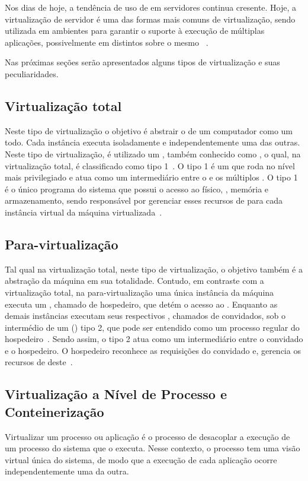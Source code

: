 Nos dias de hoje, a tendência de uso de \vms em servidores continua cresente. Hoje, a virtualização de servidor é uma das formas mais comuns de virtualização, sendo utilizada em ambientes \cloud para garantir o suporte à execução de múltiplas aplicações, possivelmente em \oss distintos sobre o mesmo \hardware~\cite{manohar2013survey}.

Nas próximas seções serão apresentados alguns tipos de virtualização e suas peculiaridades.

\subsection{Virtualização total}
Neste tipo de virtualização o objetivo é abstrair o \hardware de um computador como um todo. Cada instância executa isoladamente e independentemente uma das outras. Neste tipo de virtualização, é utilizado um \vmm, também conhecido como \hypervisor, o qual, na virtualização total, é classificado como tipo 1~\cite{campbell2006introduction}. O \hypervisor tipo 1 é um \software que roda no nível mais privilegiado e atua como um intermediário entre o \hardware e os múltiplos \sos. O \hypervisor tipo 1 é o único programa do sistema que possui o acesso ao \hardware físico, \eg \cpu, memória e armazenamento, sendo responsável por gerenciar esses recursos de \hardware para cada instância virtual da máquina virtualizada~\cite{sweeney2016virtualization}.

\subsection{Para-virtualização}
Tal qual na virtualização total, neste tipo de virtualização, o objetivo também é a abstração da máquina em sua totalidade. Contudo, em contraste com a virtualização total, na para-virtualização uma única instância da máquina executa um \so, chamado de \so hospedeiro, que detém o acesso ao \hardware. Enquanto as demais instâncias executam seus respectivos \sos, chamados de \sos convidados, sob o intermédio de um \hypervisor (\vmm) tipo 2, que pode ser entendido como um processo regular do \so hospedeiro~\cite{campbell2006introduction}. Sendo assim, o \hypervisor tipo 2 atua como um intermediário entre o \so convidado e o \so hospedeiro. O \so hospedeiro reconhece as requisições do \so convidado e, gerencia os recursos de \hardware deste~\cite{sweeney2016virtualization}.

\subsection{Virtualização a Nível de Processo e Conteinerização}
Virtualizar um processo ou aplicação é o processo de desacoplar a execução de um processo do sistema que o executa. Nesse contexto, o processo tem uma visão virtual única do sistema, de modo que a execução de cada aplicação ocorre independentemente uma da outra.

